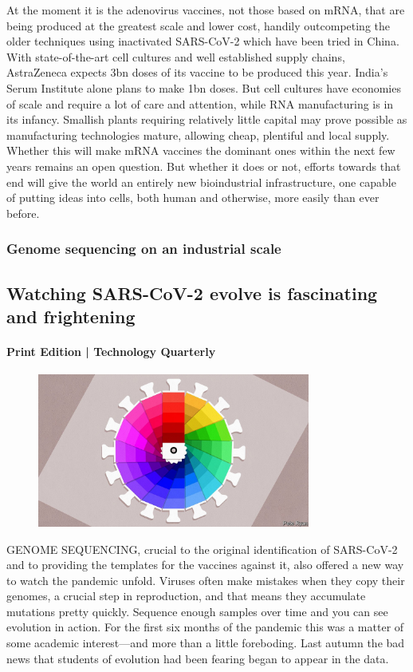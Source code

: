 \documentclass{article}
\begin{document}
At the moment it is the adenovirus vaccines, not those based on mRNA, that are being produced at the greatest scale and lower cost, handily outcompeting the older techniques using inactivated SARS-CoV-2 which have been tried in China. With state-of-the-art cell cultures and well established supply chains, AstraZeneca expects 3bn doses of its vaccine to be produced this year. India's Serum Institute alone plans to make 1bn doses. But cell cultures have economies of scale and require a lot of care and attention, while RNA manufacturing is in its infancy. Smallish plants requiring relatively little capital may prove possible as manufacturing technologies mature, allowing cheap, plentiful and local supply. Whether this will make mRNA vaccines the dominant ones within the next few years remains an open question. But whether it does or not, efforts towards that end will give the world an entirely new bioindustrial infrastructure, one capable of putting ideas into cells, both human and otherwise, more easily than ever before. {} 
\clearpage
\subsubsection{Genome sequencing on an industrial scale }
\subsection{Watching SARS-CoV-2 evolve is fascinating and frightening }
\paragraph{Print Edition | Technology Quarterly  \quad \color{gray}{Mar 23rd 2021 }}
\begin{figure}[h]
\centering
\includegraphics[width=0.8\textwidth]{images/20210327_tqd005.jpg}
\end{figure}
\lettrine{G}ENOME SEQUENCING, crucial to the original identification of SARS-CoV-2 and to providing the templates for the vaccines against it, also offered a new way to watch the pandemic unfold. Viruses often make mistakes when they copy their genomes, a crucial step in reproduction, and that means they accumulate mutations pretty quickly. Sequence enough samples over time and you can see evolution in action. For the first six months of the pandemic this was a matter of some academic interest---and more than a little foreboding. Last autumn the bad news that students of evolution had been fearing began to appear in the data. 
\end{document}
